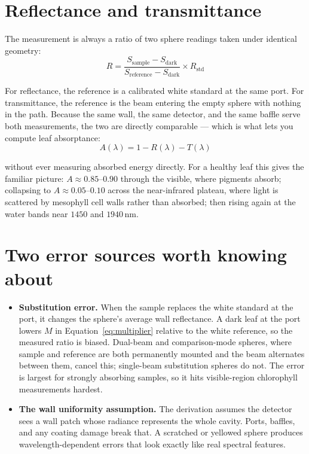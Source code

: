 \documentclass[11pt,letterpaper]{article}
\begin{document}
\section{Reflectance and transmittance}

The measurement is always a ratio of two sphere readings taken under identical geometry:
\begin{equation}
  R = \frac{S_{\mathrm{sample}} - S_{\mathrm{dark}}}
           {S_{\mathrm{reference}} - S_{\mathrm{dark}}} \times R_{\mathrm{std}}
  \label{eq:ratio}
\end{equation}

For reflectance, the reference is a calibrated white standard at the same port. For transmittance,
the reference is the beam entering the empty sphere with nothing in the path. Because the same wall,
the same detector, and the same baffle serve both measurements, the two are directly comparable ---
which is what lets you compute leaf absorptance:
\begin{equation}
  A(\lambda) = 1 - R(\lambda) - T(\lambda)
  \label{eq:absorptance}
\end{equation}

\noindent without ever measuring absorbed energy directly. For a healthy leaf this gives the
familiar picture: $A \approx 0.85$--$0.90$ through the visible, where pigments absorb; collapsing to
$A \approx 0.05$--$0.10$ across the near-infrared plateau, where light is scattered by mesophyll cell
walls rather than absorbed; then rising again at the water bands near $1450$ and $1940$\,nm.

\section{Two error sources worth knowing about}

\begin{itemize}
  \item \textbf{Substitution error.} When the sample replaces the white standard at the port, it
        changes the sphere's average wall reflectance. A dark leaf at the port lowers $M$ in
        Equation~\eqref{eq:multiplier} relative to the white reference, so the measured ratio is
        biased. Dual-beam and comparison-mode spheres, where sample and reference are both
        permanently mounted and the beam alternates between them, cancel this; single-beam
        substitution spheres do not. The error is largest for strongly absorbing samples, so it hits
        visible-region chlorophyll measurements hardest.
  \item \textbf{The wall uniformity assumption.} The derivation assumes the detector sees a wall
        patch whose radiance represents the whole cavity. Ports, baffles, and any coating damage
        break that. A scratched or yellowed sphere produces wavelength-dependent errors that look
        exactly like real spectral features.
\end{itemize}
\end{document}
